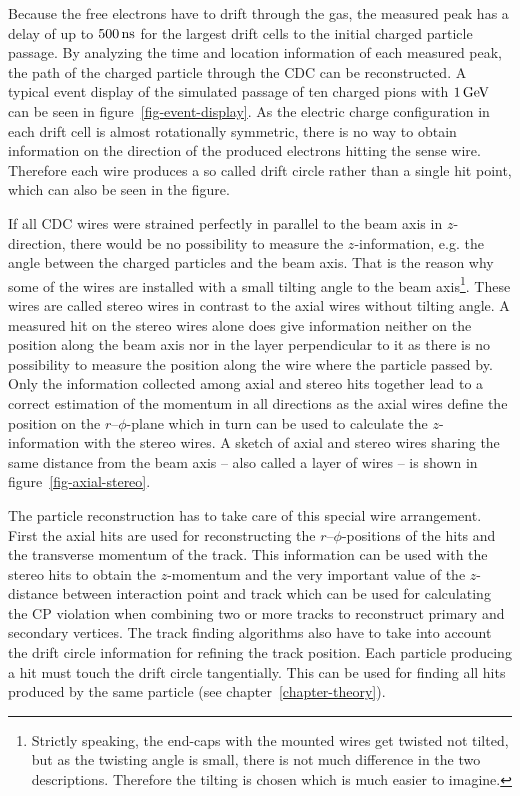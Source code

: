 Because the free electrons have to drift through the gas, the measured peak has a delay of up to $\unit[500]{ns}$ for the largest drift cells to the initial charged particle passage. By analyzing the time and location information of each measured peak, the path of the charged particle through the CDC can be reconstructed. A typical event display of the simulated passage of ten charged pions with $\unit[1]{GeV}$ can be seen in figure~\ref{fig-event-display}. As the electric charge configuration in each drift cell is almost rotationally symmetric, there is no way to obtain information on the direction of the produced electrons hitting the sense wire. Therefore each wire produces a so called drift circle rather than a single hit point, which can also be seen in the figure.

If all CDC wires were strained perfectly in parallel to the beam axis in $z$-direction, there would be no possibility to measure the $z$-information, e.g. the angle between the charged particles and the beam axis. That is the reason why some of the wires are installed with a small tilting angle to the beam axis\footnote{Strictly speaking, the end-caps with the mounted wires get twisted not tilted, but as the twisting angle is small, there is not much difference in the two descriptions. Therefore the tilting is chosen which is much easier to imagine.}. These wires are called stereo wires in contrast to the axial wires without tilting angle. A measured hit on the stereo wires alone does give information neither on the position along the beam axis nor in the layer perpendicular to it as there is no possibility to measure the position along the wire where the particle passed by. Only the information collected among axial and stereo hits together lead to a correct estimation of the momentum in all directions as the axial wires define the position on the $r$--$\phi$-plane which in turn can be used to calculate the $z$-information with the stereo wires. A sketch of axial and stereo wires sharing the same distance from the beam axis -- also called a layer of wires -- is shown in figure~\ref{fig-axial-stereo}. 

The particle reconstruction has to take care of this special wire arrangement. First the axial hits are used for reconstructing the $r$--$\phi$-positions of the hits and the transverse momentum of the track. This information can be used with the stereo hits to obtain the $z$-momentum and the very important value of the $z$-distance between interaction point and track which can be used for calculating the CP violation when combining two or more tracks to reconstruct primary and secondary vertices. The track finding algorithms also have to take into account the drift circle information for refining the track position. Each particle producing a hit must touch the drift circle tangentially. This can be used for finding all hits produced by the same particle (see chapter~\ref{chapter-theory}).

